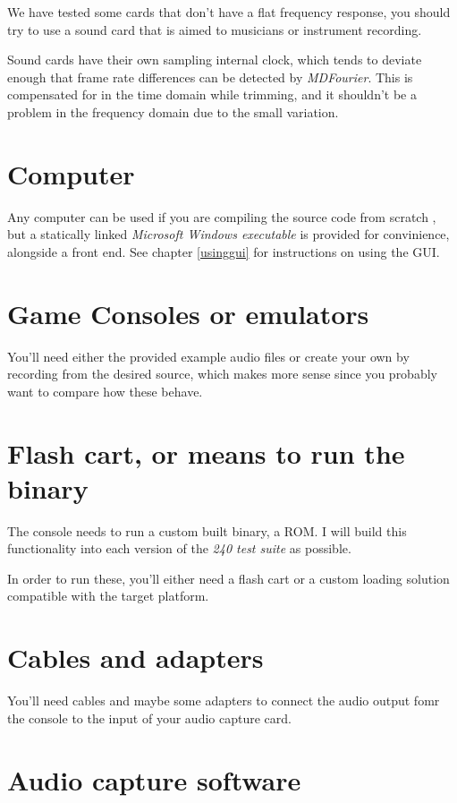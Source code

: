 \documentclass[10pt,a4paper]{report}
\begin{document}
\begin{appendices}
We have tested some cards that don't have a flat frequency response, you should try to use a sound card that is aimed to musicians or instrument recording.

Sound cards have their own sampling internal clock, which tends to deviate enough that frame rate differences can be detected by \textit{MDFourier}. This is compensated for in the time domain while trimming, and it shouldn't be a problem in the frequency domain due to the small variation. \cite{SoundCardClock}

\section{Computer}

Any computer can be used if you are compiling the source code from scratch \cite{sourcecode}, but a statically linked \textit{Microsoft Windows executable} is provided for convinience, alongside a front end. See chapter \ref{usinggui} for instructions on using the GUI.

\section{Game Consoles or emulators}

You'll need either the provided example audio files or create your own by recording from the desired source, which makes more sense since you probably want to compare how these behave.

\section{Flash cart, or means to run the binary}

The console needs to run a custom built binary, a ROM. I will build this functionality into each version of the \textit{240 test suite}\cite{240pSuite} as possible.

In order to run these, you'll either need a flash cart or a custom loading solution compatible with the target platform.

\section{Cables and adapters}

You'll need cables and maybe some adapters to connect the audio output fomr the console to the input of your audio capture card.

\section{Audio capture software}


\end{appendices}
\end{document}
